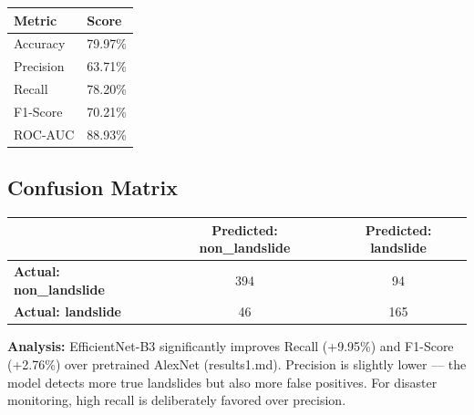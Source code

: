 \documentclass[11pt]{article}
\begin{document}
\vspace{0.3cm}
\begin{table}[h]
    \centering
    \begin{tabular}{@{}ll@{}}
        \toprule
        \textbf{Metric} & \textbf{Score} \\ \midrule
        Accuracy & 79.97\% \\
        Precision & 63.71\% \\
        Recall & 78.20\% \\
        F1-Score & 70.21\% \\
        ROC-AUC & 88.93\% \\ \bottomrule
    \end{tabular}
\end{table}

\subsection{Confusion Matrix}
\begin{table}[h]
    \centering
    \begin{tabular}{@{}lcc@{}}
        \toprule
        & \textbf{Predicted: non\_landslide} & \textbf{Predicted: landslide} \\ \midrule
        \textbf{Actual: non\_landslide} & 394 & 94 \\
        \textbf{Actual: landslide} & 46 & 165 \\ \bottomrule
    \end{tabular}
\end{table}

\textbf{Analysis:} EfficientNet-B3 significantly improves Recall (+9.95\%) and F1-Score (+2.76\%) over pretrained AlexNet (results1.md). Precision is slightly lower — the model detects more true landslides but also more false positives. For disaster monitoring, high recall is deliberately favored over precision.
\end{document}
